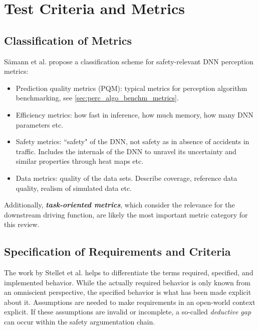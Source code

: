 \documentclass[conference]{IEEEtran}
\newcommand{\new}[1]{{\color{my-red}#1}}
\begin{document}
%
%




\section{Test Criteria and Metrics}
\label{sec:axis_criteria_metrics}

\subsection{\new{Classification of Metrics}}
Sämann et al. \cite{Saemann2020strategy} propose a classification scheme for safety-relevant DNN perception metrics: 
\begin{itemize}
\item Prediction quality metrics (PQM): typical metrics for perception algorithm benchmarking, see \ref{sec:perc_algo_benchm_metrics}.
\item Efficiency metrics: how fast in inference, how much memory, how many DNN parameters etc.
\item Safety metrics: ``safety" of the DNN, not safety as in absence of accidents in traffic. Includes the internals of the DNN to unravel its uncertainty and similar properties through heat maps etc.
\item Data metrics: quality of the data sets. Describe coverage, reference data quality, realism of simulated data etc. 
\end{itemize}

Additionally, \textit{\textbf{task-oriented metrics}}, which consider the relevance for the downstream driving function, are likely the most important metric category for this review. 

\subsection{Specification of Requirements and Criteria}
\label{sec:requirements}

The work by Stellet et al. \cite{Stellet2019formalization} helps to differentiate the terms required, specified, and implemented behavior.
While the actually required behavior is only known from an omniscient perspective, the specified behavior is what has been made explicit about it. 
Assumptions are needed to make requirements in an open-world context explicit. 
If these assumptions are invalid or incomplete, a so-called \textit{deductive gap} can occur within the safety argumentation chain. 
\end{document}
